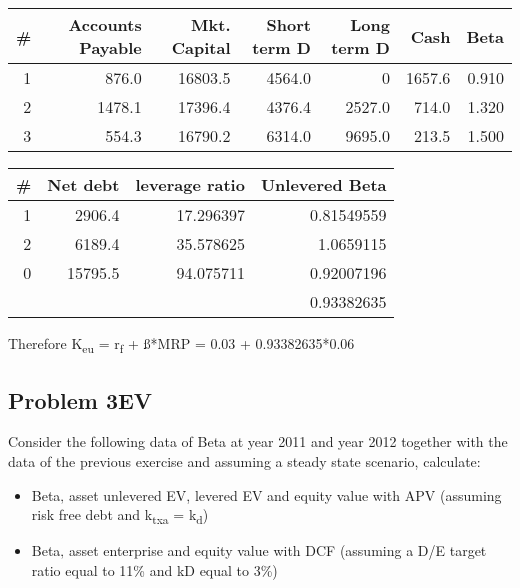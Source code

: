 \documentclass[11pt]{article}
\begin{document}
\begin{table}[htbp]
\label{Ex1P2IndustryBetaTable}
\centering
\begin{tabular}{rrrrrrr}
\# & Accounts Payable & Mkt. Capital & Short term D & Long term D & Cash & Beta\\
\hline
1 & 876.0 & 16803.5 & 4564.0 & 0 & 1657.6 & 0.910\\
2 & 1478.1 & 17396.4 & 4376.4 & 2527.0 & 714.0 & 1.320\\
3 & 554.3 & 16790.2 & 6314.0 & 9695.0 & 213.5 & 1.500\\
\end{tabular}
\end{table}
\begin{table}[htbp]
\label{Ex1P2IndustryBetaCalculation}
\centering
\begin{tabular}{rrrr}
\# & Net debt & leverage ratio & Unlevered Beta\\
\hline
1 & 2906.4 & 17.296397 & 0.81549559\\
2 & 6189.4 & 35.578625 & 1.0659115\\
0 & 15795.5 & 94.075711 & 0.92007196\\
\hline
 &  &  & 0.93382635\\
\end{tabular}
\end{table}

Therefore K\textsubscript{eu} = r\textsubscript{f} + ß*MRP = 0.03 + 0.93382635*0.06\\

\subsection*{Problem 3\hfill{}\textsc{EV}}
\label{sec:org7e15311}
Consider the following data of Beta at year 2011 and year 2012 together with the data of the previous exercise and assuming a steady state scenario, calculate:\\
\begin{itemize}
\item Beta‚ asset unlevered EV, levered EV and equity value with APV (assuming risk free debt and k\textsubscript{txa} = k\textsubscript{d})\\
\item Beta‚ asset enterprise and equity value with DCF (assuming a D/E target ratio equal to 11\% and kD equal to 3\%)\\
\end{itemize}
\end{document}

